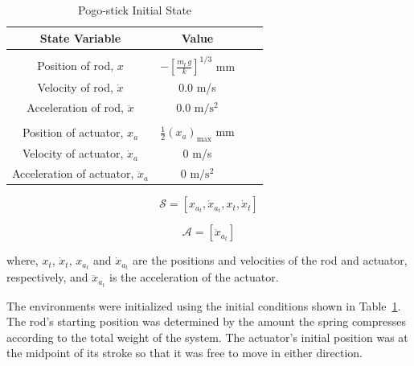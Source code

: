 \documentclass{ifacconf}
\begin{document}
      \begin{table}[tb]
         \begin{center}
         \caption{Pogo-stick Initial State}\label{tab:initialState}
            \begin{tabular}{cccc}
               \hline
               \hline
               State Variable & Value\\
               \hline & \\ [-.25cm]
               Position of rod, $x$ & $-\left[ \frac{m_t\,g}{k}\right]^{1/3}$ mm \vspace{.1cm} \\ 
               Velocity of rod, $\dot{x}$ & 0.0 m/s \\ 
               Acceleration of rod, $\ddot{x}$ & 0.0 $\mbox{m}/\mbox{s}^{2}$ \\ \hline & \\ [-.25cm]
               Position of actuator, $x_a$ & $\frac{1}{2}(x_a)_{\mbox{max}}$ mm \vspace{.05cm} \\ 
               Velocity of actuator, $\dot{x}_a$ & 0 m/s \\
               Acceleration of actuator, $\ddot{x}_a$ & 0 $\mbox{m}/\mbox{s}^{2}$ \\
               \hline \hline
            \end{tabular}
         \end{center}
      \end{table}
      \vspace{1cm} %

      \begin{equation} \label{eq:systemState}
         \mathcal{S} = \left[ x_{a_t}, \dot{x}_{a_t}, x_t, \dot{x}_t \right]
      \end{equation}
      
      \begin{equation} \label{eq:systemAction}
         \mathcal{A} = [\ddot{x}_{a_t}]
      \end{equation}

      where, $x_t$, $\dot{x}_{t}$, $x_{a_t}$ and $\dot{x}_{a_t}$ are the positions and velocities of the rod and actuator, respectively, and $\ddot{x}_{a_t}$ is the acceleration of the actuator. 

      The environments were initialized using the initial conditions shown in Table~\ref{tab:initialState}. The rod's starting position was determined by the amount the spring compresses according to the total weight of the system. The actuator's initial position was at the midpoint of its stroke so that it was free to move in either direction.
      
\end{document}
